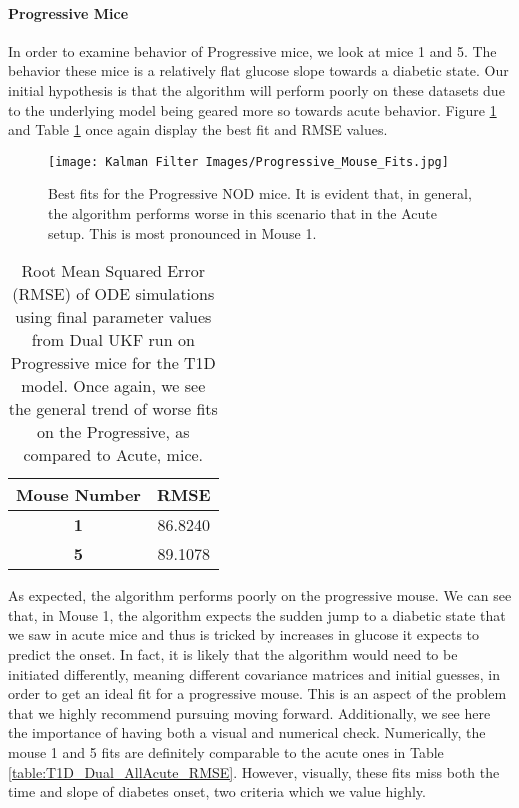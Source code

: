 \documentclass{article}
\begin{document}

\paragraph{Progressive Mice}
In order to examine behavior of Progressive mice, we look at mice 1 and 5. The behavior these mice is a relatively flat glucose slope towards a diabetic state. Our initial hypothesis is that the algorithm will perform poorly on these datasets due to the underlying model being geared more so towards acute behavior. Figure \ref{fig:T1D_Dual_Progressive_Plots} and Table \ref{table:T1D_Dual_Progressive_RMSE} once again display the best fit and RMSE values.

\begin{figure}[H]
    \centering
    \texttt{[image: Kalman Filter Images/Progressive\_Mouse\_Fits.jpg]}
    \caption{Best fits for the Progressive NOD mice. It is evident that, in general, the algorithm performs worse in this scenario that in the Acute setup. This is most pronounced in Mouse 1.}
    \label{fig:T1D_Dual_Progressive_Plots}
\end{figure}

\begin{table}[H]
  \begin{center}
    \label{tab:table1}
    \begin{tabular}{c|c} %
      \textbf{Mouse Number} & \textbf{RMSE} \\
      \hline
      \textbf{1} & 86.8240\\
      \textbf{5} & 89.1078
    \end{tabular}
    \caption{Root Mean Squared Error (RMSE) of ODE simulations using final parameter values from Dual UKF run on Progressive mice for the T1D model. Once again, we see the general trend of worse fits on the Progressive, as compared to Acute, mice.}
    \label{table:T1D_Dual_Progressive_RMSE}
  \end{center}
\end{table}


As expected, the algorithm performs poorly on the progressive mouse. We can see that, in Mouse 1, the algorithm expects the sudden jump to a diabetic state that we saw in acute mice and thus is tricked by increases in glucose it expects to predict the onset. In fact, it is likely that the algorithm would need to be initiated differently, meaning different covariance matrices and initial guesses, in order to get an ideal fit for a progressive mouse. This is an aspect of the problem that we highly recommend pursuing moving forward. Additionally, we see here the importance of having both a visual and numerical check. Numerically, the mouse 1 and 5 fits are definitely comparable to the acute ones in Table \ref{table:T1D_Dual_AllAcute_RMSE}. However, visually, these fits miss both the time and slope of diabetes onset, two criteria which we value highly.
\end{document}
